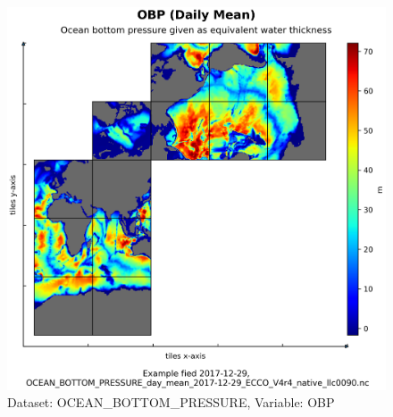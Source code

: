 \begin{longtable}{|m{}|m{}|m{}|m{}|}
\end{longtable}

\begin{figure}[H]
\centering
\includegraphics[scale=0.55]{../images/plots/native_plots/Ocean_Bottom_Pressure/OBP.png}
\caption{Dataset: OCEAN\_BOTTOM\_PRESSURE, Variable: OBP}
\label{tab:table-OCEAN_BOTTOM_PRESSURE_OBP-Plot}
\end{figure}
\pagebreak
